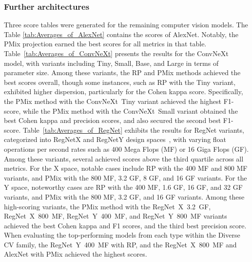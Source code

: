\documentclass[final,3p,times,twocolumn]{elsarticle}
\begin{document}
\subsubsection{Further architectures}

Three score tables were generated for the remaining computer vision models.
The Table \ref{tab:Averages_of_AlexNet} contains the scores of AlexNet. Notably, the \gls{PMix} projection earned the best scores for all metrics in that table.
Table~\ref{tab:Averages_of_ConvNeXt} presents the results for the ConvNeXt model, with variants including Tiny, Small, Base, and Large in terms of parameter size. Among these variants, the \gls{RP} and \gls{PMix} methods achieved the best scores overall, though some instances, such as \gls{RP} with the Tiny variant, exhibited higher dispersion, particularly for the Cohen kappa score. Specifically, the \gls{PMix} method with the \mbox{ConvNeXt Tiny} variant achieved the highest F1-score, while the \gls{PMix} method with the \mbox{ConvNeXt Small} variant obtained the best Cohen kappa and precision scores, and also secured the second best F1-score.
Table~\ref{tab:Averages_of_RegNet} exhibits the results for RegNet variants, categorized into RegNetX and RegNetY design spaces~\cite{RegNet}, with varying float operations per second rates such as 400 Mega Flops (MF) or 16 Giga Flops (GF). Among these variants, several achieved scores above the third quartile across all metrics. For the X space, notable cases include \gls{RP} with the 400 MF and 800 MF variants, and \gls{PMix} with the 800 MF, 3.2 GF, 8 GF, and 16 GF variants. For the Y space, noteworthy cases are \gls{RP} with the 400 MF, 1.6 GF, 16 GF, and 32 GF variants, and \gls{PMix} with the 800 MF, 3.2 GF, and 16 GF variants. Among these high-scoring variants, the \gls{PMix} method with the \mbox{RegNet X 3.2 GF}, \mbox{RegNet X 800 MF}, \mbox{RegNet Y 400 MF}, and \mbox{RegNet Y 800 MF} variants achieved the best Cohen kappa and F1 scores, and the third best precision score. 
When evaluating the top-performing models from each type within the Diverse \gls{CV} family, the \mbox{RegNet Y 400 MF} with \gls{RP}, and the \mbox{RegNet X 800 MF} and AlexNet with \gls{PMix} achieved the highest scores.
\end{document}
